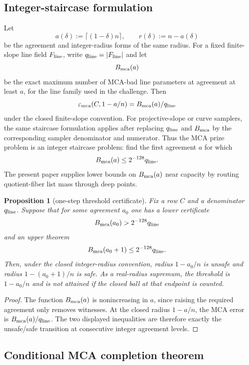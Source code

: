 \documentclass[11pt]{article}
\newtheorem{proposition}[theorem]{Proposition}
\theoremstyle{definition}
\theoremstyle{remark}
\newcommand{\emca}{\varepsilon_{\mathrm{mca}}}
\begin{document}
\subsection{Integer-staircase formulation}

Let
\[
        a(\delta):=\lceil(1-\delta)n\rceil,
        \qquad r(\delta):=n-a(\delta)
\]
be the agreement and integer-radius forms of the same radius.  For a fixed finite-slope line
field $F_{\rm line}$, write $q_{\rm line}=|F_{\rm line}|$ and let
\[
        B_{\rm mca}(a)
\]
be the exact maximum number of MCA-bad line parameters at agreement at least
$a$, for the line family used in the challenge.  Then
\[
        \emca(C,1-a/n)=B_{\rm mca}(a)/q_{\rm line}
\]
under the closed finite-slope convention.  For projective-slope or curve samplers, the same staircase formulation applies after replacing $q_{\rm line}$ and $B_{\rm mca}$ by the corresponding sampler denominator and numerator.  Thus the MCA prize problem is an
integer staircase problem: find the first agreement $a$ for which
\[
        B_{\rm mca}(a)\le 2^{-128}q_{\rm line}.
\]
The present paper supplies lower bounds on $B_{\rm mca}(a)$ near capacity by
routing quotient-fiber list mass through deep points.

\begin{proposition}[one-step threshold certificate]\label{prop:onestep}
Fix a row $C$ and a denominator $q_{\rm line}$.  Suppose that for some agreement
$a_0$ one has a lower certificate
\[
        B_{\rm mca}(a_0)>2^{-128}q_{\rm line}
\]
and an upper theorem
\[
        B_{\rm mca}(a_0+1)\le2^{-128}q_{\rm line}.
\]
Then, under the closed integer-radius convention, radius $1-a_0/n$ is unsafe and
radius $1-(a_0+1)/n$ is safe.  As a real-radius supremum, the threshold is
$1-a_0/n$ and is not attained if the closed ball at that endpoint is counted.
\end{proposition}

\begin{proof}
The function $B_{\rm mca}(a)$ is nonincreasing in $a$, since raising the
required agreement only removes witnesses.  At the closed radius $1-a/n$, the
MCA error is $B_{\rm mca}(a)/q_{\rm line}$.  The two displayed inequalities are
therefore exactly the unsafe/safe transition at consecutive integer agreement
levels.
\end{proof}

\subsection{Conditional MCA completion theorem}
\end{document}
